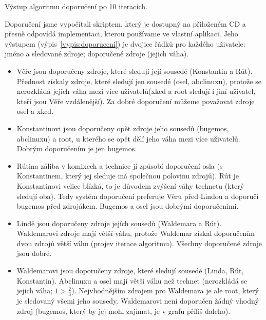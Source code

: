 \begin{vypis}
	
	\caption{Výstup algoritmu doporučení po 10 iteracích.}
	\label{vypis:doporuceni}
\end{vypis}

Doporučení jsme vypočítali skriptem, který je dostupný na přiloženém CD a přesně odpovídá implementaci, kterou používame ve vlastní aplikaci.
Jeho výstupem (výpis~\ref{vypis:doporuceni}) je dvojice řádků pro každého uživatele: jméno a sledované zdroje; doporučené zdroje (jejich váha).

\begin{itemize}
	\item Věře jsou doporučeny zdroje, které sledují její sousedé (Konstantin a Rút).
		Přednost získaly zdroje, které sledují jen sousedé (osel, abclinuxu), protože se nerozkládá jejich váha mezi více uživatelů(xkcd a root sledují i jiní uživatel, kteří jsou Věře vzdálenější).
		Za dobré doporučení můžeme považovat zdroje osel a xkcd.
	\item Konstantinovi jsou doporučeny opět zdroje jeho sousedů (bugemos, abclinuxu) a root, u kterého se opět dělí jeho váha mezi více uživatelů.
		Dobrým doporučením je jen bugemos.
	\item Rútina záliba v komixech a technice jí způsobí doporučení osla (s Konstantinem, který jej sleduje má společnou polovinu zdrojů).
		Rút je Konstantinovi velice blízká, to je důvodem zvýšení váhy technetu (který sledují oba).
		Tedy systém doporučení preferuje Věru před Lindou a doporučí bugemos před zdrojákem.
		Bugemos a osel jsou dobrými doporučeními.
	\item Lindě jsou doporučeny zdroje jejích sousedů (Waldemara a Rút).
		Waldemarovi zdroje mají větší váhu, protože Waldemar získal doporučením dvou zdrojů větší váhu (projev iterace algoritmu).
		Všechny doporučené zdroje jsou dobré.
	\item Waldemarovi jsou doporučeny zdroje, které sledují sousedé (Linda, Rút, Konstantin). Abclinuxu a osel mají větší váhu než technet (nerozkládá se jejich váha; $1 > \tfrac{2}{3}$).
		Nejvhodnějším zdrojem pro Waldemara je ale root, který je sledovaný všemi jeho sousedy.
		Waldemarovi není doporučen žádný vhodný zdroj (bugemos, který by jej mohl zajímat, je v grafu příliš daleho).
\end{itemize}
